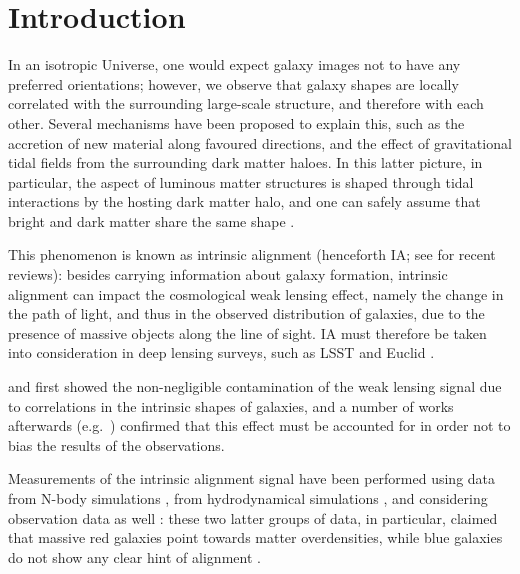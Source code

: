 \documentclass[a4paper,fleqn,usenatbib]{mnras}
\begin{document}


\section{Introduction}
\label{sec:intro}
In an isotropic Universe, one would expect galaxy images not to have any preferred orientations; however, we observe that galaxy shapes are locally correlated with the surrounding large-scale structure, and therefore with each other. Several mechanisms have been proposed to explain this, such as the accretion of new material along favoured directions, and the effect of gravitational tidal fields from the surrounding dark matter haloes. In this latter picture, in particular, the aspect of luminous matter structures is shaped through tidal interactions by the hosting dark matter halo, and one can safely assume that bright and dark matter share the same shape \citep{Kiesslingetal2015}.

This phenomenon is known as intrinsic alignment (henceforth IA; see \citealt{TroxelIshak2015, Joachimietal2015, Kiesslingetal2015, Kirketal2015} for recent reviews): besides carrying information about galaxy formation, intrinsic alignment can impact the cosmological weak lensing effect, namely the change in the path of light, and thus in the observed distribution of galaxies, due to the presence of massive objects along the line of sight. IA must therefore be taken into consideration in deep lensing surveys, such as LSST \citep{LSST2009} and Euclid \citep{Euclid2011}. 

\citet{Heavensetal2000} and \citet{CroftMetzler2000} first showed the non-negligible contamination of the weak lensing signal due to correlations in the intrinsic shapes of galaxies, and a number of works afterwards (e.g.\ \citealt{Heymansetal2006, Sembolonietal2008}) confirmed that this effect must be accounted for in order not to bias the results of the observations.

Measurements of the intrinsic alignment signal have been performed using data from N-body simulations \citep{Heymansetal2006, Kuhlenetal2007, Leeetal2008, Schneideretal2012, Joachimietal2013a, Joachimietal2013b}, from hydrodynamical simulations \citep{Codisetal2015, Velliscigetal2015b, Chisarietal2015, Tennetietal2016, Hilbertetal2017}, and considering observation data as well \citep{Joachimietal2011, Haoetal2011, Lietal2013, Singhetal2015, vanUitertJoachimi2017}: these two latter groups of data, in particular, claimed that massive red galaxies point towards matter overdensities, while blue galaxies do not show any clear hint of alignment \citep{Hirataetal2007, Mandelbaumetal2011}. 
\end{document}
